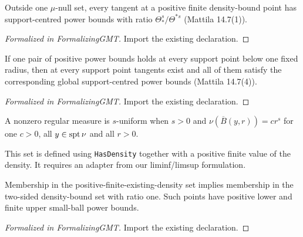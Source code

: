 \begin{theorem}
\label{gmt:mattila-14-7-1}
\leanok
{}
Outside one $\mu$-null set, every tangent at a positive finite density-bound point has support-centred power bounds with ratio $\Theta_*^s/\Theta^{*s}$ (Mattila 14.7(1)).
\end{theorem}
\begin{proof}[Formalized in FormalizingGMT]
\leanok
{}
Import the existing declaration.
\end{proof}

\begin{theorem}
\label{gmt:mattila-14-7-4}
\leanok
{}
If one pair of positive power bounds holds at every support point below one fixed radius, then at every support point tangents exist and all of them satisfy the corresponding global support-centred power bounds (Mattila 14.7(4)).
\end{theorem}
\begin{proof}[Formalized in FormalizingGMT]
\leanok
{}
Import the existing declaration.
\end{proof}

\begin{definition}
\label{def:uniform-api}
\leanok
A nonzero regular measure is $s$-uniform when $s>0$ and $\nu(\overline B(y,r))=cr^s$ for one $c>0$, all $y\in\operatorname{spt}\nu$ and all $r>0$.
\end{definition}

\begin{definition}
\label{gmt:density-exists-set}
\leanok
{}
This set is defined using \texttt{HasDensity} together with a positive finite value of the density. It requires an adapter from our liminf/limsup formulation.
\end{definition}

\begin{lemma}
\label{gmt:uniform-density-adapter}
\leanok
{}
Membership in the positive-finite-existing-density set implies membership in the two-sided density-bound set with ratio one. Such points have positive lower and finite upper small-ball power bounds.
\end{lemma}
\begin{proof}[Formalized in FormalizingGMT]
\leanok
{}
Import the existing declaration.
\end{proof}

